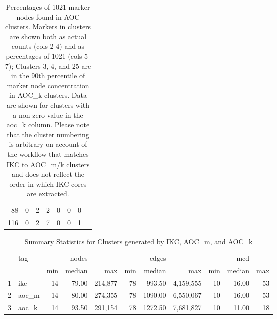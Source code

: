 \documentclass[12pt, oneside]{article}   	%
\begin{document}
\begin{table}[ht]
\begin{tabular}{rrrrrrrr}
88 & 0 &   2 &   2 &   0 &   0 &   0 \\ 
116 & 0 &  2 &   7 &   0 &   0 &   1 \\ 
   \hline
\end{tabular}
\caption{Percentages of 1021 marker nodes found in AOC clusters. Markers in clusters are shown both as actual counts (cols 2-4) and as percentages of 1021 (cols 5-7); Clusters 3, 4, and 25 are in the 90th percentile of marker node concentration in AOC\_k clusters. Data are shown for clusters with a non-zero value in the aoc\_k column. Please note that the cluster numbering is arbitrary on account of the workflow that matches IKC to AOC\_m/k clusters and does not reflect the order in which IKC cores are extracted. }
\end{table}

\begin{table}[ht]
\centering
\begin{tabular}{rlrrrrrrrrr}
  \hline
 & tag &  & nodes &  & & edges & &  & mcd &  \\ 
  & & min & median & max & min & median & max & min & median & max   \\ 
  \hline
1 & ikc &  14 & 79.00 & 214,877 &  78 & 993.50 & 4,159,555 &  10 & 16.00 &  53 \\ 
  2 & aoc\_m &  14 & 80.00 & 274,355 &  78 & 1090.00 & 6,550,067 &  10 & 16.00 &  53 \\ 
  3 & aoc\_k &  14 & 93.50 & 291,154 &  78 & 1272.50 & 7,681,827 &  10 & 11.00 &  18 \\ 
   \hline
\end{tabular}
\caption{Summary Statistics for Clusters generated by IKC, AOC\_m, and AOC\_k}
\end{table}
\end{document}
